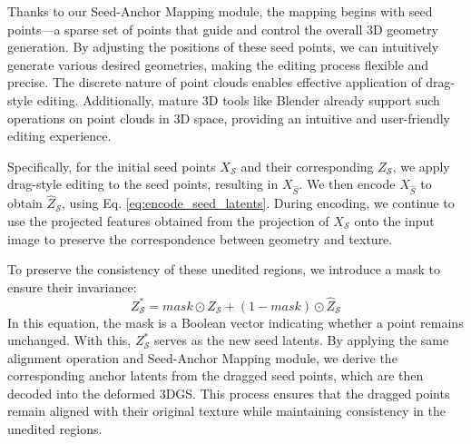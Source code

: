 Thanks to our Seed-Anchor Mapping module, the mapping  begins with seed points—a sparse set of points that guide and control the overall 3D geometry generation. By adjusting the positions of these seed points, we can intuitively generate various desired geometries, making the editing process flexible and precise. The discrete nature of point clouds enables effective application of drag-style editing. Additionally, mature 3D tools like Blender\cite{blender} already support such operations on point clouds in 3D space, providing an intuitive and user-friendly editing experience.

Specifically, for the initial seed points \( X_\mathcal{S} \) and their corresponding \( Z_\mathcal{S} \), we apply drag-style editing to the seed points, resulting in \( X_{\hat{S}} \). We then encode \( X_{\hat{S}} \) to obtain \( \hat{Z}_\mathcal{S} \), using Eq. \ref{eq:encode_seed_latents}. During encoding, we continue to use the projected features obtained from the projection of \( X_\mathcal{S} \) onto the input image to preserve the correspondence between geometry and texture.

To preserve the consistency of these unedited regions, we introduce a mask to ensure their invariance:
\begin{equation}
    Z^{*}_\mathcal{S} = mask \odot Z_\mathcal{S} + (1 - mask)\odot \hat{Z}_\mathcal{S}
\end{equation}
In this equation, the mask is a Boolean vector indicating whether a point remains unchanged. 
With this, \( Z^{*}_\mathcal{S} \) serves as the new seed latents. By applying the same alignment operation and Seed-Anchor Mapping module, we derive the corresponding anchor latents from the dragged seed points, which are then decoded into the deformed 3DGS. This process ensures that the dragged points remain aligned with their original texture while maintaining consistency in the unedited regions.


